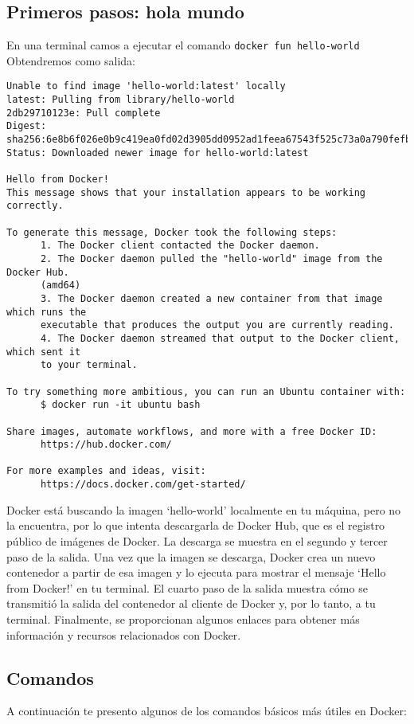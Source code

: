 \documentclass{article}
\begin{document}
\subsection{Primeros pasos: hola mundo}
En una terminal camos a ejecutar el comando \lstinline{docker fun hello-world}\\
Obtendremos como salida:
\begin{lstlisting}[numbers=none]
Unable to find image 'hello-world:latest' locally
latest: Pulling from library/hello-world
2db29710123e: Pull complete 
Digest: sha256:6e8b6f026e0b9c419ea0fd02d3905dd0952ad1feea67543f525c73a0a790fefb
Status: Downloaded newer image for hello-world:latest

Hello from Docker!
This message shows that your installation appears to be working correctly.

To generate this message, Docker took the following steps:
      1. The Docker client contacted the Docker daemon.
      2. The Docker daemon pulled the "hello-world" image from the Docker Hub.
      (amd64)
      3. The Docker daemon created a new container from that image which runs the
      executable that produces the output you are currently reading.
      4. The Docker daemon streamed that output to the Docker client, which sent it
      to your terminal.

To try something more ambitious, you can run an Ubuntu container with:
      $ docker run -it ubuntu bash

Share images, automate workflows, and more with a free Docker ID:
      https://hub.docker.com/

For more examples and ideas, visit:
      https://docs.docker.com/get-started/      
\end{lstlisting}
Docker está buscando la imagen \enquote*{hello-world} localmente en tu máquina, pero no la encuentra, por lo que intenta descargarla de Docker Hub, que es el registro público de imágenes de Docker. La descarga se muestra en el segundo y tercer paso de la salida. Una vez que la imagen se descarga, Docker crea un nuevo contenedor a partir de esa imagen y lo ejecuta para mostrar el mensaje \enquote*{Hello from Docker!} en tu terminal. El cuarto paso de la salida muestra cómo se transmitió la salida del contenedor al cliente de Docker y, por lo tanto, a tu terminal. Finalmente, se proporcionan algunos enlaces para obtener más información y recursos relacionados con Docker.

\subsection{Comandos}
A continuación te presento algunos de los comandos básicos más útiles en Docker:
\end{document}
